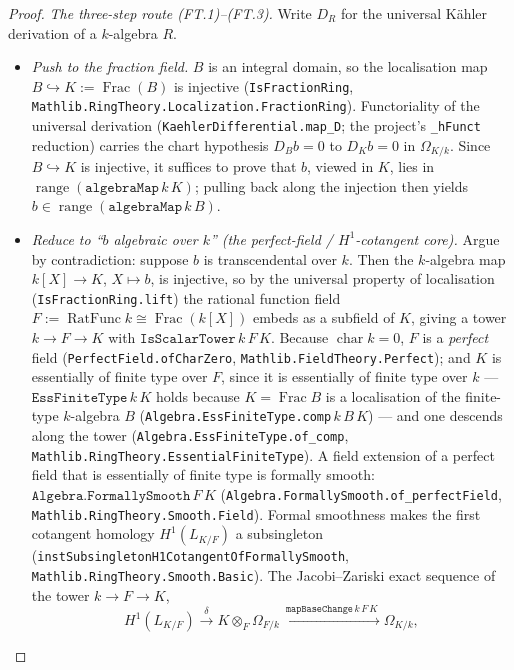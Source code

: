 \begin{proof}
  \emph{The three-step route (FT.1)--(FT.3).} Write \(D_R\) for the universal K\"ahler derivation of a \(k\)-algebra \(R\).
  \begin{itemize}
    \item[(FT.1)] \emph{Push to the fraction field.} \(B\) is an integral domain, so the localisation map \(B \hookrightarrow K := \operatorname{Frac}(B)\) is injective (\texttt{IsFractionRing}, \texttt{Mathlib.RingTheory.Localization.FractionRing}). Functoriality of the universal derivation (\texttt{KaehlerDifferential.map\_D}; the project's \texttt{\_hFunct} reduction) carries the chart hypothesis \(D_B b = 0\) to \(D_K b = 0\) in \(\Omega_{K/k}\). Since \(B \hookrightarrow K\) is injective, it suffices to prove that \(b\), viewed in \(K\), lies in \(\operatorname{range}(\mathtt{algebraMap}\,k\,K)\); pulling back along the injection then yields \(b \in \operatorname{range}(\mathtt{algebraMap}\,k\,B)\).
    \item[(FT.2)] \emph{Reduce to ``\(b\) algebraic over \(k\)'' (the perfect-field / \(H^1\)-cotangent core).} Argue by contradiction: suppose \(b\) is transcendental over \(k\). Then the \(k\)-algebra map \(k[X] \to K\), \(X \mapsto b\), is injective, so by the universal property of localisation (\texttt{IsFractionRing.lift}) the rational function field \(F := \operatorname{RatFunc} k \cong \operatorname{Frac}(k[X])\) embeds as a subfield of \(K\), giving a tower \(k \to F \to K\) with \(\mathtt{IsScalarTower}\,k\,F\,K\). Because \(\operatorname{char} k = 0\), \(F\) is a \emph{perfect} field (\texttt{PerfectField.ofCharZero}, \texttt{Mathlib.FieldTheory.Perfect}); and \(K\) is essentially of finite type over \(F\), since it is essentially of finite type over \(k\) --- \(\mathtt{EssFiniteType}\,k\,K\) holds because \(K = \operatorname{Frac} B\) is a localisation of the finite-type \(k\)-algebra \(B\) (\texttt{Algebra.EssFiniteType.comp}\,\(k\,B\,K\)) --- and one descends along the tower (\texttt{Algebra.EssFiniteType.of\_comp}, \texttt{Mathlib.RingTheory.EssentialFiniteType}). A field extension of a perfect field that is essentially of finite type is formally smooth: \(\mathtt{Algebra.FormallySmooth}\,F\,K\) (\texttt{Algebra.FormallySmooth.of\_perfectField}, \texttt{Mathlib.RingTheory.Smooth.Field}). Formal smoothness makes the first cotangent homology \(H^1(L_{K/F})\) a subsingleton (\texttt{instSubsingletonH1CotangentOfFormallySmooth}, \texttt{Mathlib.RingTheory.Smooth.Basic}). The Jacobi--Zariski exact sequence of the tower \(k \to F \to K\),
    \[
      H^1(L_{K/F}) \xrightarrow{\ \delta\ } K \otimes_F \Omega_{F/k} \xrightarrow{\ \mathtt{mapBaseChange}\,k\,F\,K\ } \Omega_{K/k},
\]
\end{itemize}
\end{proof}
